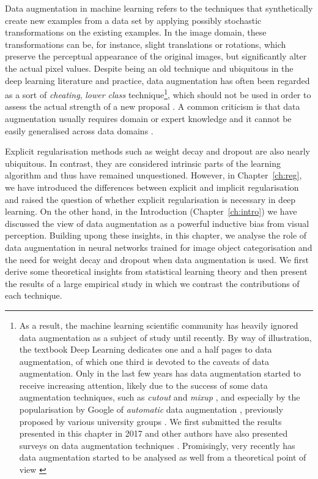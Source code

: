 {Data augmentation in machine learning refers to the techniques that synthetically create new examples from a data set by applying possibly stochastic transformations on the existing examples. In the image domain, these transformations can be, for instance, slight translations or rotations, which preserve the perceptual appearance of the original images, but significantly alter the actual pixel values. Despite being an old technique \citep{abumostafa1990hints, simard1992daug} and ubiquitous in the deep learning literature and practice, data augmentation has often been regarded as a sort of \textit{cheating}, \textit{lower class} technique\footnote{As a result, the machine learning scientific community has heavily ignored data augmentation as a subject of study until recently. By way of illustration, the textbook Deep Learning \citep{goodfellow2016dlbook} dedicates one and a half pages to data augmentation, of which one third is devoted to the caveats of data augmentation. Only in the last few years has data augmentation started to receive increasing attention, likely due to the success of some data augmentation techniques, such as \textit{cutout} \citep{devries2017cutout} and \textit{mixup} \citep{zhang2017mixup}, and especially by the popularisation by Google of \textit{automatic} data augmentation \citep{cubuk2018autoaugment}, previously proposed by various university groups \citep{hauberg2016learningdaug, antoniou2017dagan, ratner2017learningdaug, lemley2017smartdaug}. We first submitted the results presented in this chapter in 2017 \citep{hergar2018daugregopenreview} and other authors have also presented surveys on data augmentation techniques \citep{perez2017dauganalysis, shorten2019daugsurvey}. Promisingly, very recently has data augmentation started to be analysed as well from a theoretical point of view \citep{rajput2019daug, chen2019invariance, lyle2020daug}}, which should not be used in order to assess the actual strength of a new proposal \citep{goodfellow2013maxout, graham2014fracmaxpool, larsson2016fractalnet, goodfellow2016dlbook}. A common criticism is that data augmentation usually requires domain or expert knowledge and it cannot be easily generalised across data domains \citep{devries2017daugfeatspace}.

Explicit regularisation methods such as weight decay \citep{hanson1989wd} and dropout \citep{srivastava2014dropout} are also nearly ubiquitous. In contrast, they are considered intrinsic parts of the learning algorithm and thus have remained unquestioned. However, in Chapter~\ref{ch:reg}, we have introduced the differences between explicit and implicit regularisation and raised the question of whether explicit regularisation is necessary in deep learning. On the other hand, in the Introduction (Chapter~\ref{ch:intro}) we have discussed the view of data augmentation as a powerful inductive bias from visual perception. Building upong these insights, in this chapter, we analyse the role of data augmentation in neural networks trained for image object categorisation and the need for weight decay and dropout when data augmentation is used. We first derive some theoretical insights from statistical learning theory and then present the results of a large empirical study in which we contrast the contributions of each technique.
%

}
